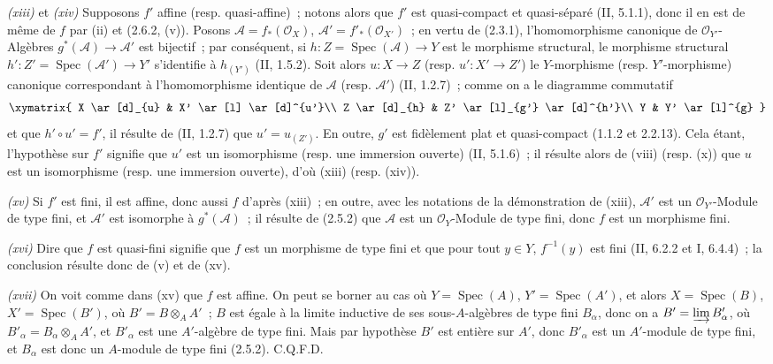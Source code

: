 \emph{(xiii)} et \emph{(xiv)} Supposons $f'$ affine (resp. quasi-affine)~;
notons alors que $f'$ est quasi-compact et quasi-séparé (II, 5.1.1), donc il
en est de même de $f$ par (ii) et (2.6.2, (v)). Posons
$\mathcal A=f_*(\mathcal O_X)$, $\mathcal A'=f'_*(\mathcal O_{X'})$~; en
vertu de (2.3.1), l'homomorphisme canonique de $\mathcal O_{Y'}$-Algèbres
$g^*(\mathcal A)\to\mathcal A'$ est bijectif~; par conséquent, si
$h:Z=\operatorname{Spec}(\mathcal A)\to Y$ est le morphisme structural, le
morphisme structural $h':Z'=\operatorname{Spec}(\mathcal A')\to Y'$
s'identifie à $h_{(Y')}$ (II, 1.5.2). Soit alors $u:X\to Z$ (resp.
$u':X'\to Z'$) le $Y$-morphisme (resp. $Y'$-morphisme) canonique
correspondant à l'homomorphisme identique de $\mathcal A$ (resp.
$\mathcal A'$) (II, 1.2.7)~; comme on a le diagramme commutatif
\[
\xymatrix{
X \ar[d]_{u} & X' \ar[l] \ar[d]^{u'}\\
Z \ar[d]_{h} & Z' \ar[l]_{g'} \ar[d]^{h'}\\
Y & Y' \ar[l]^{g}
}
\]
et que $h'\circ u'=f'$, il résulte de (II, 1.2.7) que $u'=u_{(Z')}$. En
outre, $g'$ est fidèlement plat et quasi-compact (1.1.2 et 2.2.13). Cela
étant, l'hypothèse sur $f'$ signifie que $u'$ est un isomorphisme (resp. une
immersion ouverte) (II, 5.1.6)~; il résulte alors de (viii) (resp. (x)) que
$u$ est un isomorphisme (resp. une immersion ouverte), d'où (xiii) (resp.
(xiv)).

\emph{(xv)} Si $f'$ est fini, il est affine, donc aussi $f$ d'après (xiii)~;
en outre, avec les notations de la démonstration de (xiii), $\mathcal A'$ est
un $\mathcal O_{Y'}$-Module de type fini, et $\mathcal A'$ est isomorphe à
$g^*(\mathcal A)$~; il résulte de (2.5.2) que $\mathcal A$ est un
$\mathcal O_Y$-Module de type fini, donc $f$ est un morphisme fini.

\emph{(xvi)} Dire que $f$ est quasi-fini signifie que $f$ est un morphisme de
type fini et que pour tout $y\in Y$, $f^{-1}(y)$ est fini (II, 6.2.2 et I,
6.4.4)~; la conclusion résulte donc de (v) et de (xv).

\emph{(xvii)} On voit comme dans (xv) que $f$ est affine. On peut se borner
au cas où $Y=\operatorname{Spec}(A)$, $Y'=\operatorname{Spec}(A')$, et alors
$X=\operatorname{Spec}(B)$, $X'=\operatorname{Spec}(B')$, où
$B'=B\otimes_A A'$~; $B$ est égale à la limite inductive de ses
sous-$A$-algèbres de type fini $B_\alpha$, donc on a
$B'=\varinjlim B'_\alpha$, où $B'_\alpha=B_\alpha\otimes_A A'$, et
$B'_\alpha$ est une $A'$-algèbre de type fini. Mais par hypothèse $B'$ est
entière sur $A'$, donc $B'_\alpha$ est un $A'$-module de type fini, et
$B_\alpha$ est donc un $A$-module de type fini (2.5.2). C.Q.F.D.

